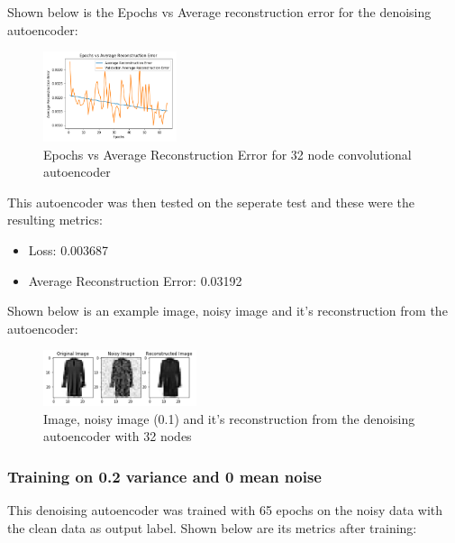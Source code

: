 \documentclass[conference]{IEEEtran}
\begin{document}
    Shown below is the Epochs vs Average reconstruction error for the denoising autoencoder:

    \begin{figure}[H]
        \centering
        \captionsetup{justification=centering}
        \centering
            \includegraphics[width=0.35\textwidth]{25.png}
            \caption{Epochs vs Average Reconstruction Error for 32 node convolutional autoencoder}
    \end{figure}

    This autoencoder was then tested on the seperate test and these were the resulting metrics:

    \begin{itemize}
        \item Loss: 0.003687
        \item Average Reconstruction Error: 0.03192\\
    \end{itemize}

    Shown below is an example image, noisy image and it's reconstruction from the autoencoder:

    \begin{figure}[H]
        \centering
        \captionsetup{justification=centering}
        \centering
            \includegraphics[width=0.4\textwidth]{26.png}
            \caption{Image, noisy image (0.1) and it's reconstruction from the denoising autoencoder with 32 nodes}
    \end{figure}




    \subsubsection{Training on 0.2 variance and 0 mean noise\\}

    This denoising autoencoder was trained with 65 epochs on the noisy data with the clean data as output label. Shown below
    are its metrics after training:
\end{document}
